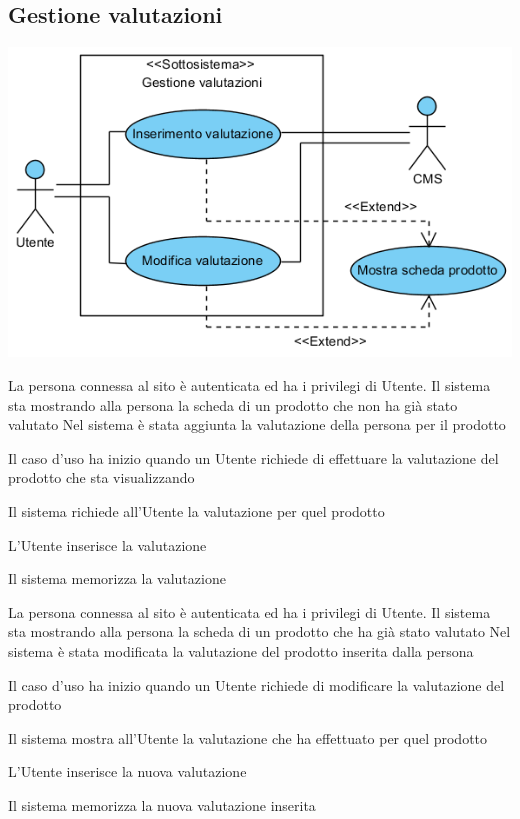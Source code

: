 \subsection{Gestione valutazioni}
\begin{center}
   \includegraphics[width=\textwidth]{assets/visualParadigm/cu/GestioneValutazioni}
\end{center}
{}
{La persona connessa al sito è autenticata ed ha i privilegi di Utente. Il sistema sta mostrando alla persona la scheda di un prodotto che non ha già stato valutato}
{Nel sistema è stata aggiunta la valutazione della persona per il prodotto}
{\begin{enumCU}
	\item Il caso d'uso ha inizio quando un Utente richiede di effettuare la valutazione del prodotto che sta visualizzando
	\item Il sistema richiede all'Utente la valutazione per quel prodotto
	\item L'Utente inserisce la valutazione
	\item Il sistema memorizza la valutazione
\end{enumCU}
}



{}
{La persona connessa al sito è autenticata ed ha i privilegi di Utente. Il sistema sta mostrando alla persona la scheda di un prodotto che ha già stato valutato}
{Nel sistema è stata modificata la valutazione del prodotto inserita dalla persona}
{\begin{enumCU}
	\item Il caso d'uso ha inizio quando un Utente richiede di modificare la valutazione del prodotto
	\item Il sistema mostra all'Utente la valutazione che ha effettuato per quel prodotto
	\item L'Utente inserisce la nuova valutazione
	\item Il sistema memorizza la nuova valutazione inserita
\end{enumCU}}

